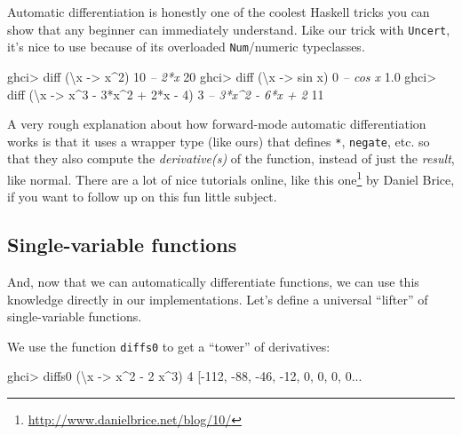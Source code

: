 \documentclass[]{article}
\newenvironment{Shaded}{}{}
\newcommand{\DecValTok}[1]{\textcolor[rgb]{0.25,0.63,0.44}{{#1}}}
\newcommand{\FloatTok}[1]{\textcolor[rgb]{0.25,0.63,0.44}{{#1}}}
\newcommand{\CommentTok}[1]{\textcolor[rgb]{0.38,0.63,0.69}{\textit{{#1}}}}
\newcommand{\OtherTok}[1]{\textcolor[rgb]{0.00,0.44,0.13}{{#1}}}
\newcommand{\FunctionTok}[1]{\textcolor[rgb]{0.02,0.16,0.49}{{#1}}}
\newcommand{\NormalTok}[1]{{#1}}
\renewcommand{\href}[2]{#2\footnote{\url{#1}}}
\begin{document}
Automatic differentiation is honestly one of the coolest Haskell tricks
you can show that any beginner can immediately understand. Like our
trick with \texttt{Uncert}, it's nice to use because of its overloaded
\texttt{Num}/numeric typeclasses.

\begin{Shaded}
\begin{Highlighting}[]
\NormalTok{ghci}\FunctionTok{>} \NormalTok{diff (\textbackslash{}x }\OtherTok{->} \NormalTok{x}\FunctionTok{^}\DecValTok{2}\NormalTok{) }\DecValTok{10}       \CommentTok{-- 2*x}
\DecValTok{20}
\NormalTok{ghci}\FunctionTok{>} \NormalTok{diff (\textbackslash{}x }\OtherTok{->} \NormalTok{sin x) }\DecValTok{0}      \CommentTok{-- cos x}
\FloatTok{1.0}
\NormalTok{ghci}\FunctionTok{>} \NormalTok{diff (\textbackslash{}x }\OtherTok{->} \NormalTok{x}\FunctionTok{^}\DecValTok{3} \FunctionTok{-} \DecValTok{3}\FunctionTok{*}\NormalTok{x}\FunctionTok{^}\DecValTok{2} \FunctionTok{+} \DecValTok{2}\FunctionTok{*}\NormalTok{x }\FunctionTok{-} \DecValTok{4}\NormalTok{) }\DecValTok{3}  \CommentTok{-- 3*x^2 - 6*x + 2}
\DecValTok{11}
\end{Highlighting}
\end{Shaded}

A very rough explanation about how forward-mode automatic
differentiation works is that it uses a wrapper type (like ours) that
defines \texttt{*}, \texttt{negate}, etc. so that they also compute the
\emph{derivative(s)} of the function, instead of just the \emph{result},
like normal. There are a lot of nice tutorials online, like
\href{http://www.danielbrice.net/blog/10/}{this one} by Daniel Brice, if
you want to follow up on this fun little subject.

\subsection{Single-variable functions}\label{single-variable-functions}

And, now that we can automatically differentiate functions, we can use
this knowledge directly in our implementations. Let's define a universal
``lifter'' of single-variable functions.

We use the function \texttt{diffs0} to get a ``tower'' of derivatives:

\begin{Shaded}
\begin{Highlighting}[]
\NormalTok{ghci}\FunctionTok{>} \NormalTok{diffs0 (\textbackslash{}x }\OtherTok{->} \NormalTok{x}\FunctionTok{^}\DecValTok{2} \FunctionTok{-} \DecValTok{2} \NormalTok{x}\FunctionTok{^}\DecValTok{3}\NormalTok{) }\DecValTok{4}
\NormalTok{[}\FunctionTok{-}\DecValTok{112}\NormalTok{, }\FunctionTok{-}\DecValTok{88}\NormalTok{, }\FunctionTok{-}\DecValTok{46}\NormalTok{, }\FunctionTok{-}\DecValTok{12}\NormalTok{, }\DecValTok{0}\NormalTok{, }\DecValTok{0}\NormalTok{, }\DecValTok{0}\NormalTok{, }\DecValTok{0}\FunctionTok{...}
\end{Highlighting}
\end{Shaded}
\end{document}

